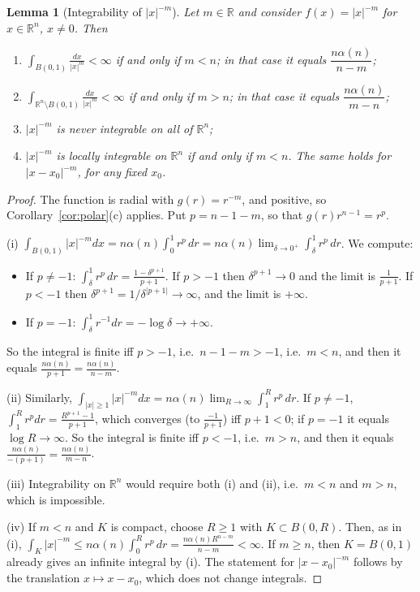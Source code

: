 \documentclass[11pt]{article}
\theoremstyle{plain}
\newtheorem{lemma}[theorem]{Lemma}
\theoremstyle{definition}
\theoremstyle{remark}
\begin{document}
\begin{lemma}[Integrability of $|x|^{-m}$]\label{lem:powers}
Let $m \in \mathbb{R}$ and consider $f(x) = |x|^{-m}$ for $x \in \mathbb{R}^n$, $x \neq 0$. Then
\begin{enumerate}
    \item[(i)] $\displaystyle\int_{B(0,1)} \frac{dx}{|x|^m} < \infty$ if and only if $m < n$; in that case it equals $\dfrac{n\alpha(n)}{n-m}$;
    \item[(ii)] $\displaystyle\int_{\mathbb{R}^n \setminus B(0,1)} \frac{dx}{|x|^m} < \infty$ if and only if $m > n$; in that case it equals $\dfrac{n\alpha(n)}{m-n}$;
    \item[(iii)] $|x|^{-m}$ is never integrable on all of $\mathbb{R}^n$;
    \item[(iv)] $|x|^{-m}$ is locally integrable on $\mathbb{R}^n$ if and only if $m < n$. The same holds for $|x - x_0|^{-m}$, for any fixed $x_0$.
\end{enumerate}
\end{lemma}
\begin{proof}
The function is radial with $g(r) = r^{-m}$, and positive, so Corollary~\ref{cor:polar}(c) applies. Put $p = n - 1 - m$, so that $g(r) r^{n-1} = r^{p}$.

(i) $\int_{B(0,1)} |x|^{-m}dx = n\alpha(n) \int_0^1 r^{p}\, dr = n\alpha(n)\lim_{\delta \to 0^+} \int_\delta^1 r^p\, dr$. We compute:
\begin{itemize}
    \item If $p \neq -1$: $\int_\delta^1 r^p\, dr = \frac{1 - \delta^{p+1}}{p+1}$. If $p > -1$ then $\delta^{p+1} \to 0$ and the limit is $\frac{1}{p+1}$. If $p < -1$ then $\delta^{p+1} = 1/\delta^{|p+1|} \to \infty$, and the limit is $+\infty$.
    \item If $p = -1$: $\int_\delta^1 r^{-1}dr = -\log \delta \to +\infty$.
\end{itemize}
So the integral is finite iff $p > -1$, i.e.\ $n - 1 - m > -1$, i.e.\ $m < n$, and then it equals $\frac{n\alpha(n)}{p+1} = \frac{n\alpha(n)}{n-m}$.

(ii) Similarly, $\int_{|x| \geq 1} |x|^{-m}dx = n\alpha(n)\lim_{R\to\infty}\int_1^R r^p\, dr$. If $p \ne -1$, $\int_1^R r^p dr = \frac{R^{p+1} - 1}{p+1}$, which converges (to $\frac{-1}{p+1}$) iff $p + 1 < 0$; if $p = -1$ it equals $\log R \to \infty$. So the integral is finite iff $p < -1$, i.e.\ $m > n$, and then it equals $\frac{n\alpha(n)}{-(p+1)} = \frac{n\alpha(n)}{m - n}$.

(iii) Integrability on $\mathbb{R}^n$ would require both (i) and (ii), i.e.\ $m < n$ and $m > n$, which is impossible.

(iv) If $m < n$ and $K$ is compact, choose $R \geq 1$ with $K \subset B(0,R)$. Then, as in (i), $\int_K |x|^{-m} \leq n\alpha(n)\int_0^R r^p\, dr = \frac{n\alpha(n) R^{n-m}}{n-m} < \infty$. If $m \geq n$, then $K = B(0,1)$ already gives an infinite integral by (i). The statement for $|x - x_0|^{-m}$ follows by the translation $x \mapsto x - x_0$, which does not change integrals.
\end{proof}
\end{document}
